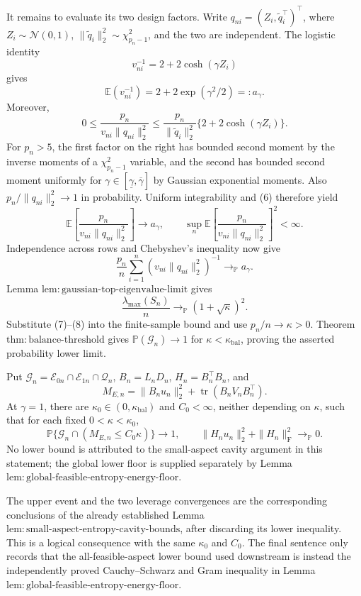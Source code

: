 It remains to evaluate its two design factors.  Write \(q_{ni}=(Z_i,\widetilde q_i^\top)^\top\), where \(Z_i\sim\mathcal N(0,1)\), \(\|\widetilde q_i\|_2^2\sim\chi^2_{p_n-1}\), and the two are independent.  The logistic identity
\[
 v_{ni}^{-1}=2+2\cosh(\gamma Z_i)
 \tag{5}
\]
gives
\[
 \mathbb E(v_{ni}^{-1})=2+2\exp(\gamma^2/2)=:a_\gamma.
 \tag{6}
\]
Moreover,
\[
 0\le \frac{p_n}{v_{ni}\|q_{ni}\|_2^2}
 \le \frac{p_n}{\|\widetilde q_i\|_2^2}
       \{2+2\cosh(\gamma Z_i)\}.
\]
For \(p_n>5\), the first factor on the right has bounded second moment by the inverse moments of a \(\chi^2_{p_n-1}\) variable, and the second has bounded second moment uniformly for \(\gamma\in[\underline\gamma,\overline\gamma]\) by Gaussian exponential moments.  Also \(p_n/\|q_{ni}\|_2^2\to1\) in probability.  Uniform integrability and (6) therefore yield
\[
 \mathbb E\!\left[\frac{p_n}{v_{ni}\|q_{ni}\|_2^2}\right]\to a_\gamma,
 \qquad
 \sup_n\mathbb E\!\left[\frac{p_n}{v_{ni}\|q_{ni}\|_2^2}\right]^2<\infty.
\]
Independence across rows and Chebyshev's inequality now give
\[
 \frac{p_n}{n}\sum_{i=1}^n(v_{ni}\|q_{ni}\|_2^2)^{-1}
 \longrightarrow_{\mathbb P}a_\gamma.
 \tag{7}
\]
Lemma \(\mathrm{lem{:}gaussian\mbox{-}top\mbox{-}eigenvalue\mbox{-}limit}\) gives
\[
 \frac{\lambda_{\max}(S_n)}n
 \longrightarrow_{\mathbb P}(1+\sqrt\kappa)^2.
 \tag{8}
\]
Substitute (7)--(8) into the finite-sample bound and use \(p_n/n\to\kappa>0\).  Theorem \(\mathrm{thm{:}balance\mbox{-}threshold}\) gives \(\mathbb P(\mathcal G_n)\to1\) for \(\kappa<\kappa_{\mathrm{bal}}\), proving the asserted probability lower limit.

Put \(\mathcal G_n=\mathcal E_{0n}\cap\mathcal E_{1n}\cap\mathcal Q_n\), \(B_n=L_nD_n\), \(H_n=B_n^\top B_n\), and
\[
 M_{E,n}=\|B_nu_n\|_2^2+
 \operatorname{tr}(B_nV_nB_n^\top).
\]
At \(\gamma=1\), there are \(\kappa_0\in(0,\kappa_{\mathrm{bal}})\) and \(C_0<\infty\), neither depending on \(\kappa\), such that for each fixed \(0<\kappa<\kappa_0\),
\[
 \mathbb P\{\mathcal G_n\cap(M_{E,n}\le C_0\kappa)\}\to1,
 \qquad
 \|H_nu_n\|_2^2+\|H_n\|_{\mathrm F}^2
 \longrightarrow_{\mathbb P}0.
\]
No lower bound is attributed to the small-aspect cavity argument in this statement; the global lower floor is supplied separately by Lemma \(\mathrm{lem{:}global\mbox{-}feasible\mbox{-}entropy\mbox{-}energy\mbox{-}floor}\).

The upper event and the two leverage convergences are the corresponding conclusions of the already established Lemma \(\mathrm{lem{:}small\mbox{-}aspect\mbox{-}entropy\mbox{-}cavity\mbox{-}bounds}\), after discarding its lower inequality.  This is a logical consequence with the same \(\kappa_0\) and \(C_0\).  The final sentence only records that the all-feasible-aspect lower bound used downstream is instead the independently proved Cauchy--Schwarz and Gram inequality in Lemma \(\mathrm{lem{:}global\mbox{-}feasible\mbox{-}entropy\mbox{-}energy\mbox{-}floor}\).

